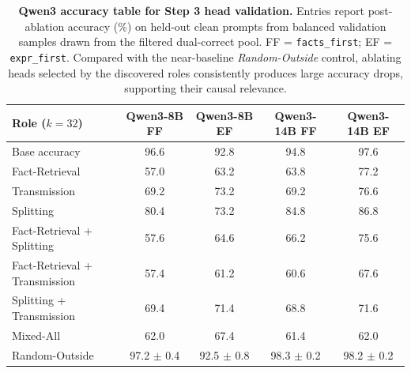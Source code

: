 \documentclass[11pt]{article}
\begin{document}
\begin{table}[t]
\centering
\small
\renewcommand{\arraystretch}{0.96}
\setlength{\tabcolsep}{5pt}
\begin{tabular}{@{} l c c c c @{}}
\toprule
\textbf{Role ($k=32$)} & \textbf{Qwen3-8B FF} & \textbf{Qwen3-8B EF} & \textbf{Qwen3-14B FF} & \textbf{Qwen3-14B EF} \\
\midrule
Base accuracy & 96.6 & 92.8 & 94.8 & 97.6 \\
Fact-Retrieval & 57.0 & 63.2 & 63.8 & 77.2 \\
Transmission & 69.2 & 73.2 & 69.2 & 76.6 \\
Splitting & 80.4 & 73.2 & 84.8 & 86.8 \\
Fact-Retrieval + Splitting & 57.6 & 64.6 & 66.2 & 75.6 \\
Fact-Retrieval + Transmission & 57.4 & 61.2 & 60.6 & 67.6 \\
Splitting + Transmission & 69.4 & 71.4 & 68.8 & 71.6 \\
Mixed-All & 62.0 & 67.4 & 61.4 & 62.0 \\
Random-Outside & 97.2 $\pm$ 0.4 & 92.5 $\pm$ 0.8 & 98.3 $\pm$ 0.2 & 98.2 $\pm$ 0.2 \\
\bottomrule
\end{tabular}
\caption{\textbf{Qwen3 accuracy table for Step 3 head validation.} Entries report post-ablation accuracy (\%) on held-out clean prompts from balanced validation samples drawn from the filtered dual-correct pool. FF = \texttt{facts\_first}; EF = \texttt{expr\_first}. Compared with the near-baseline \textit{Random-Outside} control, ablating heads selected by the discovered roles consistently produces large accuracy drops, supporting their causal relevance.}
\label{tab:qwen3_head_accuracy_appendix}
\end{table}
\end{document}
